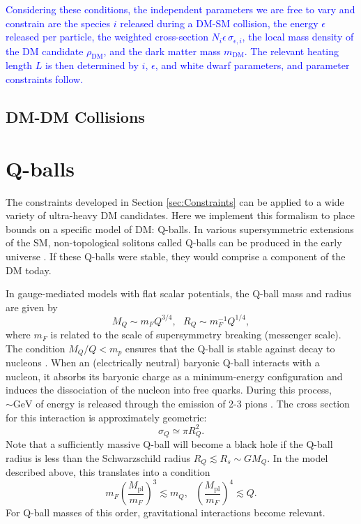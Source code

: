 \documentclass[twocolumn,showpacs,preprintnumbers,amsmath,amssymb,prd]{revtex4}
\newcommand{\Mpl}{M_{\text{pl}}}
\def\r{\right)}
\def\l{\left(}
\begin{document}
\textcolor{blue}{Considering these conditions, the independent parameters we are free to vary and constrain are the species $i$ released during a DM-SM collision, the energy $\epsilon$ released per particle, the weighted cross-section $N_i \epsilon\, \sigma_{\epsilon,i}$, the local mass density of the DM candidate $\rho_\text{DM}$, and the dark matter mass $m_\text{DM}$. The relevant heating length $L$ is then determined by $i$, $\epsilon$, and white dwarf parameters, and parameter constraints follow.}


\subsection{DM-DM Collisions}
\label{sec:CollisionConstraints}

\section{Q-balls}
\label{sec:ConcreteExamples}

The constraints developed in Section \ref{sec:Constraints} can be applied to a wide variety of ultra-heavy DM candidates. Here we implement this formalism to place bounds on a specific model of DM: Q-balls. In various supersymmetric extensions of the SM, non-topological solitons called Q-balls can be produced in the early universe \cite{Coleman:1985ki, Kusenko:1997si}. If these Q-balls were stable, they would comprise a component of the DM today.

In gauge-mediated models with flat scalar potentials, the Q-ball mass and radius are given by
\begin{equation}
\label{eq:Qballprop}
M_Q \sim m_F Q^{3/4}, ~~~ R_Q \sim m_F^{-1} Q^{1/4},
\end{equation}
where $m_F$ is related to the scale of supersymmetry breaking (messenger scale). The condition $M_Q/Q < m_p$ ensures that the Q-ball is stable against decay to nucleons \cite{Dine:2003ax}. When an (electrically neutral) baryonic Q-ball interacts with a nucleon, it absorbs its baryonic charge as a minimum-energy configuration and induces the dissociation of the nucleon into free quarks. During this process, $\sim \text{GeV}$ of energy is released through the emission of 2-3 pions \cite{Dine:2003ax}. The cross section for this interaction is approximately geometric:
\begin{equation}
\sigma_Q \simeq \pi R_Q^2.
\end{equation}
Note that a sufficiently massive Q-ball will become a black hole if the Q-ball radius is less than the Schwarzschild radius $R_Q \lesssim R_s \sim G M_Q$. In the model described above, this translates into a condition
\begin{equation}
m_F \l\frac{\Mpl}{m_F}\r^3 \lesssim m_Q, ~~~ \l\frac{\Mpl}{m_F}\r^4 \lesssim Q.
\end{equation}
For Q-ball masses of this order, gravitational interactions become relevant.
\end{document}
